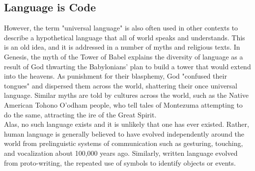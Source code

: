 



\subsection{Language is Code}



However, the term "universal language" is also often used in other contexts to describe a hypothetical language that all of world speaks and understands. This is an old idea, and it is addressed in a number of myths and religious texts. In Genesis, the myth of the Tower of Babel explains the diversity of language as a result of God thwarting the Babylonians' plan to build a tower that would extend into the heavens. As punishment for their blasphemy, God "confused their tongues" and dispersed them across the world, shattering their once universal language. Similar myths are told by cultures across the world, such as the Native American Tohono O'odham people, who tell tales of Montezuma attempting to do the same, attracting the ire of the Great Spirit. \\

Alas, no such language exists and it is unlikely that one has ever existed. Rather, human language is generally believed to have evolved independently around the world from prelinguistic systems of communication such as gesturing, touching, and vocalization about 100,000 years ago. Similarly, written language evolved from proto-writing, the repeated use of symbols to identify objects or events. \\

